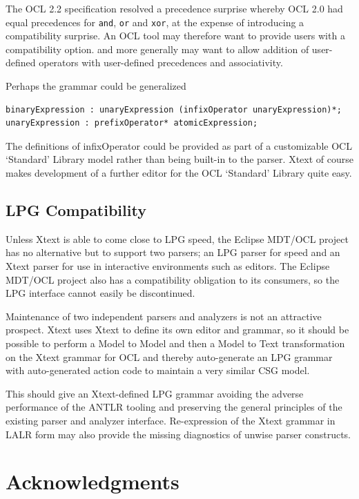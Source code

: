 \documentclass[runningheads,a4paper]{llncs}
\begin{document}
The OCL 2.2 specification resolved a precedence surprise whereby OCL 2.0 had equal precedences for \verb+and+, \verb+or+ and \verb+xor+, at the expense of introducing a compatibility surprise. An OCL tool may therefore want to provide users with a compatibility option. and more generally may want to allow addition of user-defined operators with user-defined precedences and associativity.

Perhaps the grammar could be generalized

{\small\begin{verbatim}
binaryExpression : unaryExpression (infixOperator unaryExpression)*;
unaryExpression : prefixOperator* atomicExpression;
\end{verbatim}}
 
The definitions of infixOperator could be provided as part of a customizable OCL `Standard' Library model rather than being built-in to the parser. Xtext of course makes development of a further editor for the OCL `Standard' Library quite easy.

\subsection{LPG Compatibility}

Unless Xtext is able to come close to LPG speed, the Eclipse MDT/OCL project has no alternative but to support two parsers; an LPG parser for speed and an Xtext parser for use in interactive environments such as editors. The Eclipse MDT/OCL project also has a compatibility obligation to its consumers, so the LPG interface cannot easily be discontinued.

Maintenance of two independent parsers and analyzers is not an attractive prospect. Xtext uses Xtext to define its own editor and grammar, so it should be possible to perform a Model to Model and then a Model to Text transformation on the Xtext grammar for OCL and thereby auto-generate an LPG grammar with auto-generated action code to maintain a very similar CSG model.

This should give an Xtext-defined LPG grammar avoiding the adverse performance of the ANTLR tooling and preserving the general principles of the existing parser and analyzer interface. Re-expression of the Xtext grammar in LALR form may also provide the missing diagnostics of unwise parser constructs.

\section{Acknowledgments}
\end{document}

